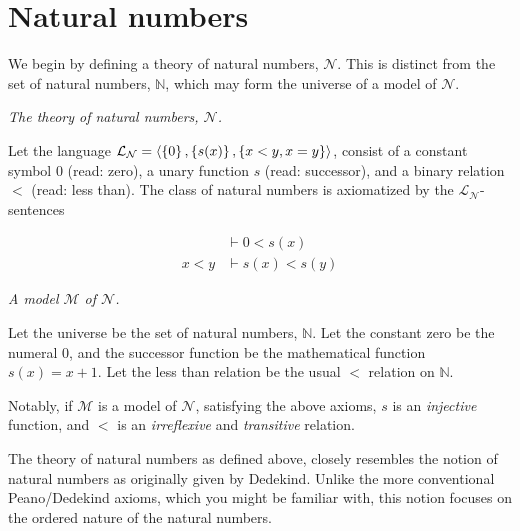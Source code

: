 \section{Natural numbers}

We begin by defining a theory of natural numbers, $\mathcal{N}$. This is
distinct from the set of natural numbers, $\mathbb{N}$, which may form the
universe of a model of $\mathcal{N}$.

\begin{definition} \textit{The theory of natural numbers, $\mathcal{N}$.}

Let the language
$\mathcal{L}_{\mathcal{N}}=\left\langle{\ensuremath{\left\{{0}\right\}},\ensuremath{\left\{{s(x)}\right\}},\ensuremath{\left\{{x<y,x=y}\right\}}}\right\rangle$, consist of
a constant symbol $0$ (read: zero), a unary function $s$ (read: successor), and
a binary relation $<$ (read: less than). The class of natural numbers is
axiomatized by the $\mathcal{L}_{\mathcal{N}}$-sentences

\begin{align}
&\vdash 0 < s(x) \\
x < y &\vdash s(x) < s(y)
\end{align}

\end{definition}

\begin{example} \textit{A model $\mathcal{M}$ of $\mathcal{N}$.}

Let the universe be the set of natural numbers, $\mathbb{N}$. Let the constant
zero be the numeral $0$, and the successor function be the mathematical
function $s(x)=x+1$. Let the less than relation be the usual $<$ relation on
$\mathbb{N}$.

Notably, if $\mathcal{M}$ is a model of $\mathcal{N}$, satisfying the above
axioms, $s$ is an \emph{injective} function, and $<$ is an \emph{irreflexive}
and \emph{transitive} relation.

\end{example}

\begin{remark}

The theory of natural numbers as defined above, closely resembles the notion of
natural numbers as originally given by Dedekind\cite{beman-1901,joyce-2005}.
Unlike the more conventional Peano/Dedekind axioms, which you might be familiar
with, this notion focuses on the ordered nature of the natural numbers.

\end{remark}

